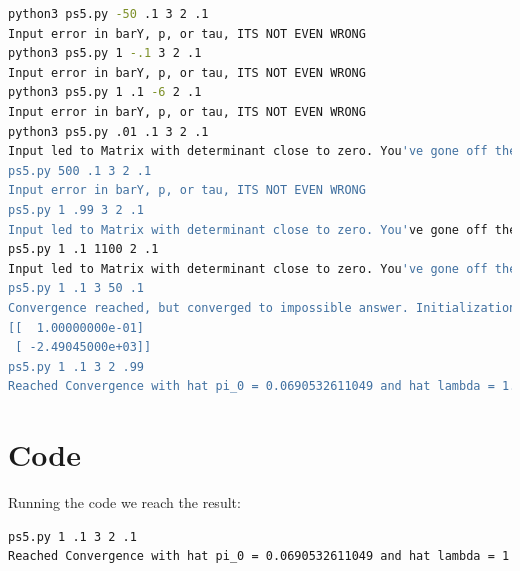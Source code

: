 \documentclass[10pt, letterpaper]{paper}
\begin{document}
\begin{lstlisting}[language=sh]
python3 ps5.py -50 .1 3 2 .1
Input error in barY, p, or tau, ITS NOT EVEN WRONG
python3 ps5.py 1 -.1 3 2 .1
Input error in barY, p, or tau, ITS NOT EVEN WRONG
python3 ps5.py 1 .1 -6 2 .1
Input error in barY, p, or tau, ITS NOT EVEN WRONG
python3 ps5.py .01 .1 3 2 .1
Input led to Matrix with determinant close to zero. You've gone off the reservation
ps5.py 500 .1 3 2 .1
Input error in barY, p, or tau, ITS NOT EVEN WRONG
ps5.py 1 .99 3 2 .1
Input led to Matrix with determinant close to zero. You've gone off the reservation
ps5.py 1 .1 1100 2 .1
Input led to Matrix with determinant close to zero. You've gone off the reservation
ps5.py 1 .1 3 50 .1
Convergence reached, but converged to impossible answer. Initialization problem.
[[  1.00000000e-01]
 [ -2.49045000e+03]]
ps5.py 1 .1 3 2 .99
Reached Convergence with hat pi_0 = 0.0690532611049 and hat lambda = 1.13522746211
\end{lstlisting}


\section*{Code}  
Running the code we reach the result: 

\begin{lstlisting}[language=sh]
ps5.py 1 .1 3 2 .1
Reached Convergence with hat pi_0 = 0.0690532611049 and hat lambda = 1.13522746211
\end{lstlisting}



\end{document}
